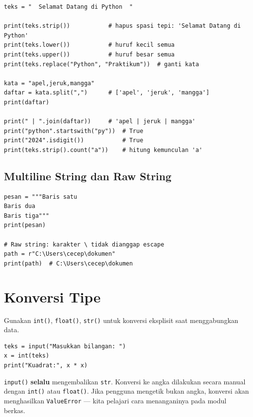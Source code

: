 \documentclass[../main.tex]{subfiles}
\begin{document}
\begin{lstlisting}[caption=Metode string bawaan]
teks = "  Selamat Datang di Python  "

print(teks.strip())           # hapus spasi tepi: 'Selamat Datang di Python'
print(teks.lower())           # huruf kecil semua
print(teks.upper())           # huruf besar semua
print(teks.replace("Python", "Praktikum"))  # ganti kata

kata = "apel,jeruk,mangga"
daftar = kata.split(",")      # ['apel', 'jeruk', 'mangga']
print(daftar)

print(" | ".join(daftar))     # 'apel | jeruk | mangga'
print("python".startswith("py"))  # True
print("2024".isdigit())           # True
print(teks.strip().count("a"))    # hitung kemunculan 'a'
\end{lstlisting}

\subsection{Multiline String dan Raw String}

\begin{lstlisting}[caption=String multiline dan raw]
pesan = """Baris satu
Baris dua
Baris tiga"""
print(pesan)

# Raw string: karakter \ tidak dianggap escape
path = r"C:\Users\cecep\dokumen"
print(path)  # C:\Users\cecep\dokumen
\end{lstlisting}

\section{Konversi Tipe}

Gunakan \texttt{int()}, \texttt{float()}, \texttt{str()} untuk konversi eksplisit saat menggabungkan data.

\begin{lstlisting}[caption=Konversi masukan pengguna]
teks = input("Masukkan bilangan: ")
x = int(teks)
print("Kuadrat:", x * x)
\end{lstlisting}

\begin{catatan}
\texttt{input()} \textbf{selalu} mengembalikan \texttt{str}. Konversi ke angka dilakukan secara manual dengan \texttt{int()} atau \texttt{float()}. Jika pengguna mengetik bukan angka, konversi akan menghasilkan \texttt{ValueError} --- kita pelajari cara menanganinya pada modul berkas.
\end{catatan}
\end{document}
